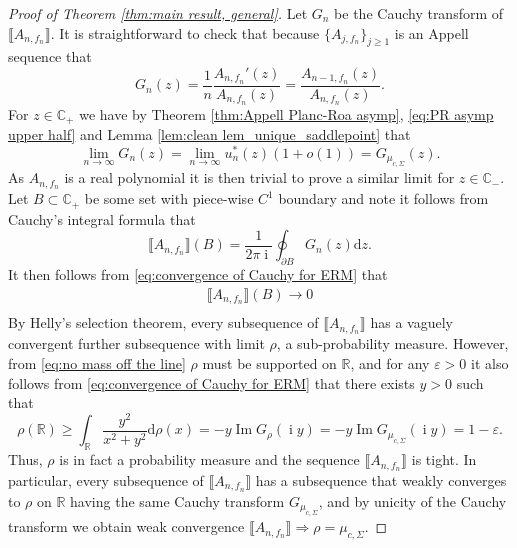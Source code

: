 \documentclass[reqno]{amsart}
\newcommand{\1}{\mathbf{1}}
\newcommand{\dd}{\mathrm{d}}
\DeclareMathOperator{\ii}{i}
\newcommand{\C}{\mathbb{C}}
\renewcommand\Im{\operatorname{Im}}
\newcommand{\eps}{\varepsilon}
\newcommand{\R}{\mathbb{R}}
\def\R{\mathbb{R}}
\theoremstyle{plain}
\theoremstyle{definition}
\theoremstyle{remark}
\numberwithin{equation}{section}
\begin{document}
\begin{proof}[Proof of Theorem \ref{thm:main result, general}]
 Let $G_n$ be the Cauchy transform of $\llbracket A_{n,f_n}\rrbracket$. It is straightforward to check that because $\{A_{j,f_n}\}_{j\geq 1}$ is an Appell sequence that  \begin{equation}
	 	G_{n}(z)=\frac{1}{n}\frac{A_{n,f_n}'(z)}{A_{n,f_n}(z)}=\frac{A_{n-1,f_n}(z)}{A_{n,f_n}(z)}.
	 \end{equation}For $z\in\C_{+}$ we have by Theorem \ref{thm:Appell Planc-Roa asymp}, \eqref{eq:PR asymp upper half} and Lemma  \ref{lem:clean lem_unique_saddlepoint}  that \begin{equation}\label{eq:convergence of Cauchy for ERM} 
				\lim\limits_{n\rightarrow\infty} G_{n}(z)=\lim\limits_{n\rightarrow\infty} u_n^*(z)(1+o(1))=G_{\mu_{c,\Sigma}}(z). 
	\end{equation} As $A_{n,f_n}$ is a real polynomial it is then trivial to prove a similar limit for $z\in\C_{-}$. Let $B\subset\C_{+}$ be some set with piece-wise $C^1$ boundary and note it follows from Cauchy's integral formula that \begin{equation}
	\llbracket A_{n,f_n}\rrbracket(B)=\frac{1}{2\pi\ii}\oint_{\partial B}G_{n}(z)\dd z.
	\end{equation} It then follows from \eqref{eq:convergence of Cauchy for ERM} that \begin{equation}\label{eq:no mass off the line}
	\begin{aligned}
		\llbracket A_{n,f_n}\rrbracket(B)\rightarrow0\\
	\end{aligned}
		\end{equation} By Helly's selection theorem, every subsequence of $\llbracket A_{n,f_n}\rrbracket$ has a vaguely convergent further subsequence with limit $\rho$, a sub-probability measure. However, from \eqref{eq:no mass off the line} $\rho$ must be supported on $\R$, and for any $\eps>0$ it also follows from \eqref{eq:convergence of Cauchy for ERM} that  there exists $y>0$ such that\begin{equation}
	\rho(\R)\geq \int_{\R}\frac{y^2}{x^2+y^2}\dd \rho(x)=-y\Im G_{\rho}(\ii y)=-y\Im G_{\mu_{c,\Sigma}}(\ii y)=1-\eps.
	\end{equation} Thus, $\rho$ is in fact a probability measure and the sequence $\llbracket A_{n,f_n}\rrbracket$ is tight. In particular, every subsequence of $\llbracket A_{n,f_n}\rrbracket$ has a subsequence that weakly converges to $\rho$ on $\R$ having the same Cauchy transform $G_{\mu_{c,\Sigma}}$, and by unicity of the Cauchy transform we obtain weak convergence $\llbracket A_{n,f_n}\rrbracket \Rightarrow \rho=\mu_{c,\Sigma} $.
\end{proof}
\end{document}
